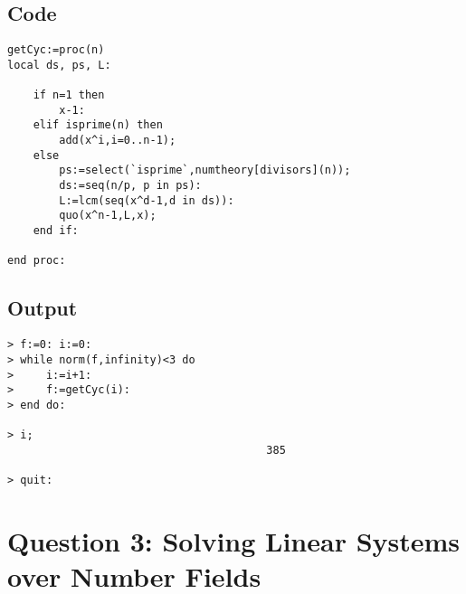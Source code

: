 \documentclass[10pt]{report}
\begin{document}
\subsection*{Code}
\begin{verbatim}
getCyc:=proc(n)
local ds, ps, L:
    
    if n=1 then
        x-1:
    elif isprime(n) then
        add(x^i,i=0..n-1);
    else
        ps:=select(`isprime`,numtheory[divisors](n));
        ds:=seq(n/p, p in ps):
        L:=lcm(seq(x^d-1,d in ds)):
        quo(x^n-1,L,x);
    end if:
    
end proc:
\end{verbatim}

\subsection*{Output}
\begin{verbatim}
> f:=0: i:=0:
> while norm(f,infinity)<3 do
>     i:=i+1:
>     f:=getCyc(i):
> end do:

> i;
                                        385

> quit:
\end{verbatim}

\newpage
\section*{Question 3: Solving Linear Systems over Number Fields}
\end{document}
